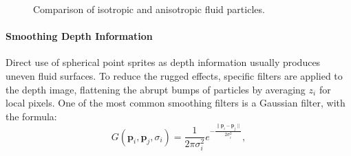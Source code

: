 \documentclass[times,twocolumn,final]{elsarticle}
\begin{document}
\begin{figure}[htbp]
    \centering
    \caption{Comparison of isotropic and anisotropic fluid particles.}
    \label{fig:figure3}
\end{figure}

\paragraph{Smoothing Depth Information}
Direct use of spherical point sprites as depth information usually produces uneven fluid surfaces. To reduce the rugged effects, specific filters are applied to the depth image, flattening the abrupt bumps of particles by averaging $z_i$ for local pixels. One of the most common smoothing filters is a Gaussian filter\cite{ref:ref24}, with the formula:
\begin{equation}
    G\left({\mathbf{p}}_i, {\mathbf{p}}_j, \sigma_i\right)
    =
    \frac{1}{2 \pi \sigma_i^{2}} e^{-\frac{ \| {\mathbf{p}}_i - {\mathbf{p}}_j \| }{2 \sigma_i^{2}}} , 
\label{con:equ2}
\end{equation}
\end{document}
